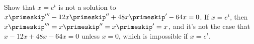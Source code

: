 {Show that $x = e^{t}$ is not a solution to $x\primeskip'''-12 x\primeskip'' + 48 x\primeskip' - 64 x = 0$.}
{If $x=e^t$, then $x\primeskip''' = x\primeskip'' = x\primeskip'= x$, and it's not the case that $x-12x+48x-64x=0$ unless $x=0$, which is impossible if $x=e^t$.}